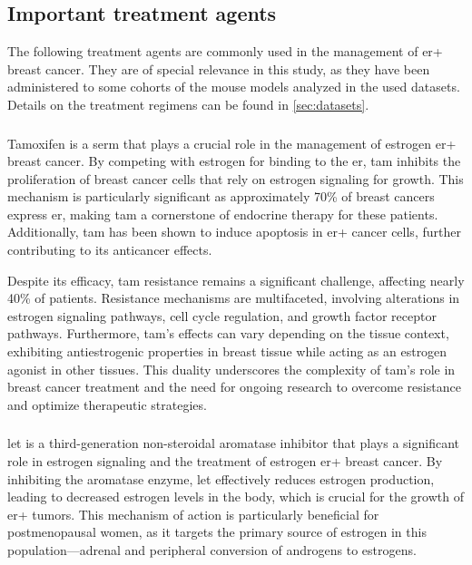 \subsection{Important treatment agents}
\label{sec:important_treatments}

The following treatment agents are commonly used in the management of \gls{er+}
breast cancer.
They are of special relevance in this study, as they have been administered to
some cohorts of the mouse models analyzed in the used datasets.
Details on the treatment regimens can be found in \cref{sec:datasets}.

\subsubsection{}

Tamoxifen is a \gls{serm} that plays a crucial role in the management of
estrogen \gls{er+} breast cancer.
By competing with estrogen for binding to the \gls{er}, \gls{tam} inhibits the
proliferation of breast cancer cells that rely on estrogen signaling for
growth\supercite{radhi_tamoxifen_2023}.
This mechanism is particularly significant as approximately 70\% of breast
cancers express \gls{er}, making \gls{tam} a cornerstone of endocrine therapy
for these patients\supercite{wang_induced_2019}.
Additionally, \gls{tam} has been shown to induce apoptosis in \gls{er+} cancer
cells, further contributing to its anticancer
effects\supercite{li_tamoxifen_2017}.

Despite its efficacy, \gls{tam} resistance remains a significant challenge,
affecting nearly 40\% of patients\supercite{tuttle_novel_2012}.
Resistance mechanisms are multifaceted, involving alterations in estrogen
signaling pathways, cell cycle regulation, and growth factor receptor
pathways\supercite{zhuang_p21-activated_2015,mills_mechanisms_2018}.
Furthermore, \gls{tam}'s effects can vary depending on the tissue context,
exhibiting antiestrogenic properties in breast tissue while acting as an
estrogen agonist in other tissues\supercite{jovanovska_effects_2021}.
This duality underscores the complexity of \gls{tam}'s role in breast cancer
treatment and the need for ongoing research to overcome resistance and optimize
therapeutic strategies.

\subsubsection{}

\Gls{let} is a third-generation non-steroidal aromatase inhibitor that plays a
significant role in estrogen signaling and the treatment of estrogen \gls{er+}
breast cancer.
By inhibiting the aromatase enzyme, \gls{let} effectively reduces estrogen
production, leading to decreased estrogen levels in the body, which is crucial
for the growth of \gls{er+} tumors\supercite{priyadarsini_quality_2022}.
This mechanism of action is particularly beneficial for postmenopausal women,
as it targets the primary source of estrogen in this population—adrenal and
peripheral conversion of androgens to
estrogens\supercite{priyadarsini_quality_2022}.


